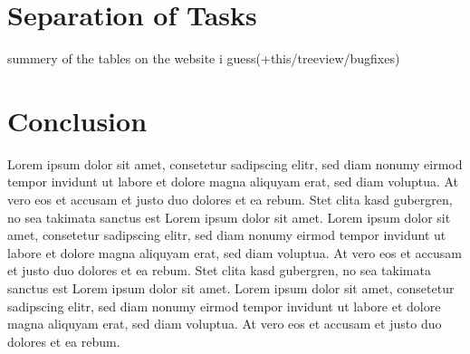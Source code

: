 \documentclass{vgtc}                          %
\begin{document}
\section{Separation of Tasks}

summery of the tables on the website i guess(+this/treeview/bugfixes)

\section{Conclusion}

Lorem ipsum dolor sit amet, consetetur sadipscing elitr, sed diam
nonumy eirmod tempor invidunt ut labore et dolore magna aliquyam erat,
sed diam voluptua. At vero eos et accusam et justo duo dolores et ea
rebum. Stet clita kasd gubergren, no sea takimata sanctus est Lorem
ipsum dolor sit amet. Lorem ipsum dolor sit amet, consetetur
sadipscing elitr, sed diam nonumy eirmod tempor invidunt ut labore et
dolore magna aliquyam erat, sed diam voluptua. At vero eos et accusam
et justo duo dolores et ea rebum. Stet clita kasd gubergren, no sea
takimata sanctus est Lorem ipsum dolor sit amet. Lorem ipsum dolor sit
amet, consetetur sadipscing elitr, sed diam nonumy eirmod tempor
invidunt ut labore et dolore magna aliquyam erat, sed diam
voluptua. At vero eos et accusam et justo duo dolores et ea
rebum.

%

%
%
%


\end{document}
